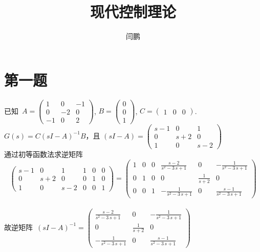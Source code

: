 \documentclass[a4paper]{article}
\begin{document}
\title{现代控制理论}
\author{闫鹏}
\date{}
\maketitle
\noindent
\section*{第一题}
\mbox{已知 }$ A=\left(\begin{array}{ccc} 1 & 0 & -1\\ 0 & -2 & 0\\ -1 & 0 & 2 \end{array}\right) $,
$ B=\left(\begin{array}{c} 0\\ 0\\ 1 \end{array}\right) $,  $ C=\left(\begin{array}{ccc} 1 & 0 & 0 \end{array}\right)$. \\
$ G(s)=C(sI-A)^{-1}B $，\mbox{且}
$ (sI-A)=\left(\begin{array}{ccc} s - 1 & 0 & 1\\ 0 & s + 2 & 0\\ 1 & 0 & s - 2 \end{array}\right) $ \\
\mbox{通过初等函数法求逆矩阵} \\
\begin{displaymath}
\left(\begin{array}{cccccc} s - 1 & 0 & 1 & 1 & 0 & 0\\ 0 & s + 2 & 0 & 0 & 1 & 0\\ 1 & 0 & s - 2 & 0 & 0 & 1 \end{array}\right) = \left(\begin{array}{cccccc} 1 & 0 & 0 & \frac{s - 2}{s^2 - 3\, s + 1} & 0 & -\frac{1}{s^2 - 3\, s + 1}\\ 0 & 1 & 0 & 0 & \frac{1}{s + 2} & 0\\ 0 & 0 & 1 & -\frac{1}{s^2 - 3\, s + 1} & 0 & \frac{s - 1}{s^2 - 3\, s + 1} \end{array}\right)
\end{displaymath} \\
\mbox{故逆矩阵 }$(sI-A)^{-1}= \left(\begin{array}{ccc} \frac{s - 2}{s^2 - 3\, s + 1} & 0 & -\frac{1}{s^2 - 3\, s + 1}\\ 0 & \frac{1}{s + 2} & 0\\ -\frac{1}{s^2 - 3\, s + 1} & 0 & \frac{s - 1}{s^2 - 3\, s + 1} \end{array}\right) $ \\
\end{document}

